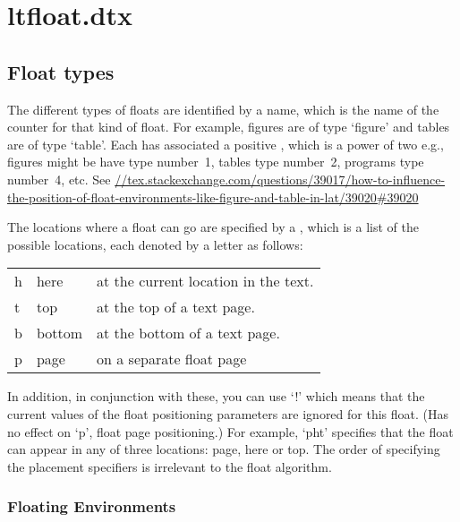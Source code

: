 \chapter{ltfloat.dtx}
\label{kernel:ltfloat}
 \section{Float types}

  The different types of floats are identified by a  name,
  which is the name of the counter for that kind of float.  For
  example, figures are of type `figure' and tables are of type `table'.
  Each  has associated a positive , which
  is a power of two e.g.,\\
  figures might be have type number~1, tables type number~2, programs
  type number~4, etc. See \url{//tex.stackexchange.com/questions/39017/how-to-influence-the-position-of-float-environments-like-figure-and-table-in-lat/39020#39020}

  The locations where a float can go are specified by a
  , which is a list of the possible
  locations, each denoted by a letter as follows:

    \begin{center}
    \begin{tabular}{l@{ : }l@{ --- }l}
     h & here   & at the current location in the text.\\
     t & top    & at the top of a text page.\\
     b & bottom & at the bottom of a text page.\\
     p & page   & on a separate float page
    \end{tabular}
    \end{center}

  In addition, in conjunction with these, you can use `!' which means
  that the current values of the float positioning parameters are
  ignored for this float. (Has no effect on `p', float page
  positioning.)
  For example, `pht' specifies that the float can appear in any of
  three locations: page, here or top. The order of specifying the placement
  specifiers is irrelevant to the float algorithm.


\subsection{Floating Environments}
    \begin{teX}
    \end{teX}



